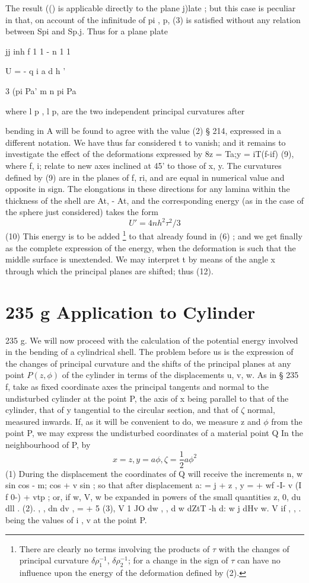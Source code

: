 The result (() is applicable directly to the plane j)late ; but this case is
peculiar in that, on account of the infinitude of pi , p, (3) is satisfied
without any relation between Spi and Sp.j. Thus for a plane plate

jj inh f 1 1 - n  1 1

U = - q i a d h '

3 (pi Pa' m n pi Pa

where l p , l p, are the two independent principal curvatures after

bending in A will be found to agree with the value (2) § 214, expressed in
a different notation.  We have thus far considered t to vanish; and it remains
to investigate the effect of the deformations expressed by 8z = Ta;y = iT(f-if)
(9), where f, i; relate to new axes inclined at 45' to those of x, y. The
curvatures defined by (9) are in the planes of f, ri, and are equal in
numerical value and opposite in sign. The elongations in these directions for
any lamina within the thickness of the shell are At,
- At, and the corresponding energy
(as in the case of the sphere just considered) takes the form
\[ U' = 4 n h^2 \tau^2/3\]
(10)
This energy is to be added
\footnote{There are clearly no terms involving the products of \(\tau \)
with the changes of principal curvature
\(\delta \rho_1^{-1}\), \(\delta \rho_2^{-1}\); for a change
in the sign of \(\tau \) can have no influence upon the energy of the
deformation defined by (2).}
to that already found in (6) ; and we get finally as the complete expression of
the energy, when the deformation is such that the middle surface is unextended.
We may interpret t by means of the angle x through which the principal planes
are shifted; thus (12).

\section{235 g Application to Cylinder}
235 g. We will now proceed with the calculation of the
potential energy involved in the bending of a cylindrical shell.  The problem
before us is the expression of the changes of principal curvature and the
shifts of the principal planes at any point
\(P (z, \phi)\)
of the cylinder in terms
of the displacements
u, v, w. As in § 235 f, take as fixed coordinate axes the
principal tangents and normal to the undisturbed cylinder at the point P, the
axis of x being parallel to that of the cylinder, that of y tangential to the
circular section, and that of \(\zeta \)  normal, measured inwards. If, as it will be
convenient to do, we measure z and
\(\phi \) from the point P, we may express the
undisturbed coordinates of a material point Q In the neighbourhood of P, by
\[ x=z, y= a \phi ,  \zeta = \frac{1}{2} a \phi^2 \]
(1) During the displacement the coordinates of Q will receive the increments
n, w sin cos - m; cos + v sin  ; so that after displacement a: = j + z , y = +
wf -I- v (I f 0-) + vtp ;
or, if w, V, w be expanded in powers of the small quantities z, 0, du dll .
(2).
, , dn dv ,
= + 5
(3),
V 1 JO dw ,  ,
d w
dZtT -h d: w j dHv
w.  V if , , . being the values of i , v at the point P.

